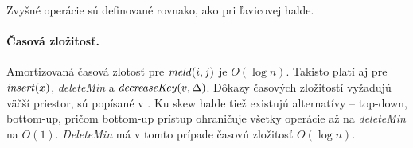 Zvyšné operácie sú definované rovnako, ako pri ľavicovej halde.

\paragraph{Časová zložitosť.}
Amortizovaná časová zlotosť pre $\mathop{\mathit{meld}}(i,j)$ je $O(\log n)$.
Takisto platí aj pre $\mathop{\mathit{insert}}(x)$, \emph{deleteMin} a $\mathop{\mathit{decreaseKey}}(v,\Delta)$.
Dôkazy časových zložitostí vyžadujú väčší priestor, sú popísané v \cite{skew}.
Ku skew halde tiež existujú alternatívy -- top-down, bottom-up, pričom
bottom-up prístup ohraničuje všetky operácie až na \emph{deleteMin} na $O(1)$.
\emph{DeleteMin} má v tomto prípade časovú zložitosť $O(\log n)$.